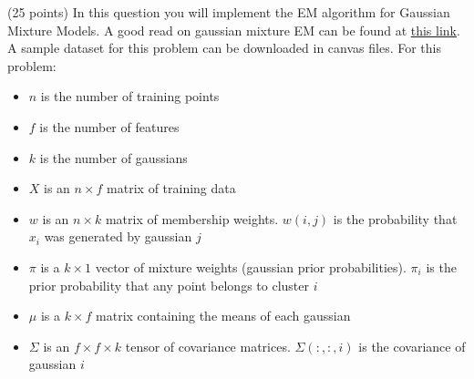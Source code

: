 \documentclass{exam}
\begin{document}
\begin{questions}

\newpage
{}\label{q4} (25 points)
In this question you will implement the EM algorithm for Gaussian Mixture Models. A good read on gaussian
mixture EM can be found at \href{https://www.ics.uci.edu/~smyth/courses/cs274/notes/Notes7_Mixtures_and_EM.pdf}{this link}. A
sample dataset for this problem can be downloaded in canvas files. For this problem:
\begin{itemize}
\item $n$ is the number of training points
\item $f$ is the number of features
\item $k$ is the number of gaussians
\item $X$ is an $n\times f$ matrix of training data
\item $w$ is an $n\times k$ matrix of membership weights. $w(i, j)$ is the probability that $x_i$ was generated by gaussian $j$
\item $\pi$ is a $k\times 1$ vector of mixture weights (gaussian prior probabilities). $\pi_i$ is the prior probability that any point belongs to cluster $i$
\item $\mu$ is a $k\times f$ matrix containing the means of each gaussian
\item $\Sigma$ is an $ f \times f\times k$ tensor of covariance matrices. $\Sigma(:, :, i)$ is the covariance of gaussian $i$
\end{itemize}


\end{questions}
\end{document}
